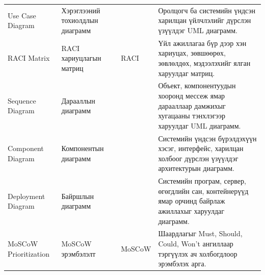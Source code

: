 {\begin{longtable}{P{0.22} P{0.20} P{0.10} P{0.40}}
Use Case Diagram & Хэрэглээний тохиолдлын диаграмм &  & Оролцогч ба системийн үндсэн харилцан үйлчлэлийг дүрслэн үзүүлдэг UML диаграмм. \\
RACI Matrix & RACI хариуцлагын матриц & RACI & Үйл ажиллагаа бүр дээр хэн хариуцах, зөвшөөрөх, зөвлөлдөх, мэдээлэхийг ялган харуулдаг матриц. \\
Sequence Diagram & Дарааллын диаграмм &  & Объект, компонентуудын хооронд мессеж ямар дарааллаар дамжихыг хугацааны тэнхлэгээр харуулдаг UML диаграмм. \\
Component Diagram & Компонентын диаграмм &  & Системийн үндсэн бүрэлдэхүүн хэсэг, интерфейс, харилцан холбоог дүрслэн үзүүлдэг архитектурын диаграмм. \\
Deployment Diagram & Байршлын диаграмм &  & Системийн програм, сервер, өгөгдлийн сан, контейнерүүд ямар орчинд байрлаж ажиллахыг харуулдаг диаграмм. \\
MoSCoW Prioritization & MoSCoW эрэмбэлэлт & MoSCoW & Шаардлагыг Must, Should, Could, Won't ангиллаар тэргүүлэх ач холбогдлоор эрэмбэлэх арга. \\

\bottomrule
\end{longtable}
}
